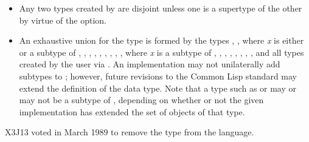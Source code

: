 \begin{itemize}
\item
Any two types created by  are disjoint unless
one is a supertype of the other by virtue of
the  option.
\end{itemize}

\begin{obsolete}
\begin{itemize}
\item
An exhaustive union for the type  is formed by the types
, ,  where {\it x} is either {\true} or 
a subtype
of , , , , ,
, , , ,
 where {\it x} is a
subtype of ,
, , , , ,
, , and all types created by the user
via .
An implementation may not unilaterally add subtypes to
; however, future revisions to the Common Lisp standard may
extend the definition of the  data type.
Note that a type such as  or  may or may
not be a subtype of , depending on whether or not the given
implementation has extended the set of objects of that type.
\end{itemize}
\end{obsolete}

\begin{newer}
X3J13 voted in March 1989
to remove the type  from the language.
\end{newer}
